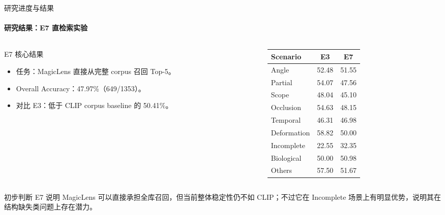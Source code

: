 \documentclass[10pt,aspectratio=169,]{beamer}
\begin{document}
\begin{frame}{研究进度与结果}
	\framesubtitle{研究结果：E7 直检索实验}
	\begin{columns}[T]
		\begin{column}{0.44\textwidth}
			\begin{block}{E7 核心结果}
				\begin{itemize}
					\item 任务：MagicLens 直接从完整 corpus 召回 Top-5。
					\item Overall Accuracy：47.97\%（649/1353）。
					\item 对比 E3：低于 CLIP corpus baseline 的 50.41\%。
				\end{itemize}
			\end{block}
		\end{column}
		\begin{column}{0.52\textwidth}
			\centering
			\scriptsize
			\begin{tabular}{lcc}
				\toprule
				Scenario & E3 & E7 \\
				\midrule
				Angle & 52.48 & 51.55 \\
				Partial & 54.07 & 47.56 \\
				Scope & 48.04 & 45.10 \\
				Occlusion & 54.63 & 48.15 \\
				Temporal & 46.31 & 46.98 \\
				Deformation & 58.82 & 50.00 \\
				Incomplete & 22.55 & 32.35 \\
				Biological & 50.00 & 50.98 \\
				Others & 57.50 & 51.67 \\
				\bottomrule
			\end{tabular}
		\end{column}
	\end{columns}
	\vspace{0.4em}
	\begin{alertblock}{初步判断}
		E7 说明 MagicLens 可以直接承担全库召回，但当前整体稳定性仍不如 CLIP；不过它在 Incomplete 场景上有明显优势，说明其在结构缺失类问题上存在潜力。
	\end{alertblock}
\end{frame}
\end{document}
